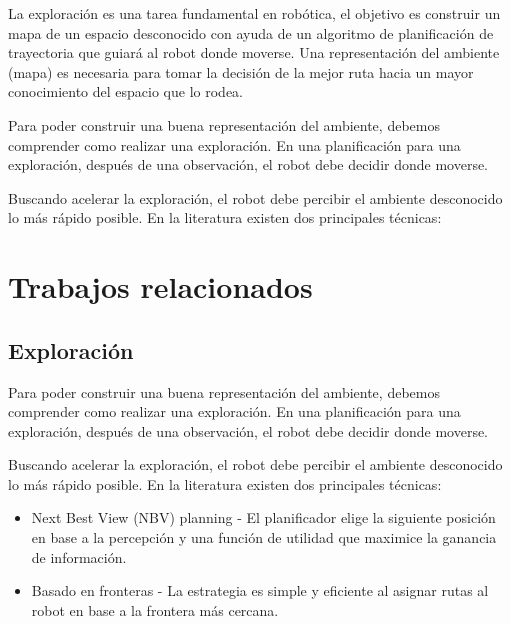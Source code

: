 
La exploración es una tarea fundamental en robótica, el objetivo es construir un mapa de un espacio desconocido con ayuda de un algoritmo de planificación de trayectoria que guiará al robot donde moverse. Una representación del ambiente (mapa) es necesaria para tomar la decisión de la mejor ruta hacia un mayor conocimiento del espacio que lo rodea.

Para poder construir una buena representación del ambiente, debemos comprender como realizar una exploración. En una planificación para una exploración, después de una observación, el robot debe decidir donde moverse.

Buscando acelerar la exploración, el robot debe percibir el ambiente desconocido lo más rápido posible. En la literatura existen dos principales técnicas:

\section{Trabajos relacionados} \label{}

\subsection{Exploración}

Para poder construir una buena representación del ambiente, debemos comprender como realizar una exploración. En una planificación para una exploración, después de una observación, el robot debe decidir donde moverse.

Buscando acelerar la exploración, el robot debe percibir el ambiente desconocido lo más rápido posible. En la literatura existen dos principales técnicas:

\begin{itemize}\setlength{\itemsep}{-1mm}
\item Next Best View (NBV) planning - El planificador elige la siguiente posición en base a la percepción y una función de utilidad que maximice la ganancia de información. 
\item Basado en fronteras - La estrategia es simple y eficiente al asignar rutas al robot en base a la frontera más cercana.
\end{itemize}


